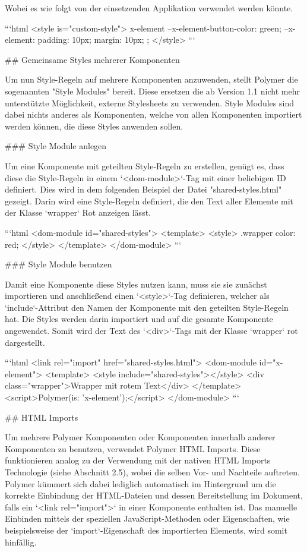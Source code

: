 Wobei es wie folgt von der einsetzenden Applikation verwendet werden könnte.

```html
<style is="custom-style">
  x-element {
    --x-element-button-color: green;
    --x-element: {
        padding: 10px;
        margin: 10px;
    };
  }
</style>
```


## Gemeinsame Styles mehrerer Komponenten

Um nun Style-Regeln auf mehrere Komponenten anzuwenden, stellt Polymer die sogenannten "Style Modules" bereit. Diese ersetzen die ab Version 1.1 nicht mehr unterstützte Möglichkeit, externe Stylesheets zu verwenden. Style Modules sind dabei nichts anderes als Komponenten, welche von allen Komponenten importiert werden können, die diese Styles anwenden sollen.


### Style Module anlegen

Um eine Komponente mit geteilten Style-Regeln zu erstellen, genügt es, dass diese die Style-Regeln in einem `<dom-module>`-Tag mit einer beliebigen ID definiert. Dies wird in dem folgenden Beispiel der Datei "shared-styles.html" gezeigt. Darin wird eine Style-Regeln definiert, die den Text aller Elemente mit der Klasse `wrapper` Rot anzeigen lässt.

```html
<dom-module id="shared-styles">
  <template>
    <style>
      .wrapper { color: red; }
    </style>
  </template>
</dom-module>
```


### Style Module benutzen

Damit eine Komponente diese Styles nutzen kann, muss sie sie zunächst importieren und anschließend einen `<style>`-Tag definieren, welcher als `include`-Attribut den Namen der Komponente mit den geteilten Style-Regeln hat. Die Styles werden darin importiert und auf die gesamte Komponente angewendet. Somit wird der Text des `<div>`-Tags mit der Klasse `wrapper` rot dargestellt.

```html
<link rel="import" href="shared-styles.html">
<dom-module id="x-element">
  <template>
    <style include="shared-styles"></style>
    <div class="wrapper">Wrapper mit rotem Text</div>
  </template>
  <script>Polymer({is: 'x-element'});</script>
</dom-module>
```


## HTML Imports

Um mehrere Polymer Komponenten oder Komponenten innerhalb anderer Komponenten zu benutzen, verwendet Polymer HTML Imports. Diese funktionieren analog zu der Verwendung mit der nativen HTML Imports Technologie (siehe Abschnitt 2.5), wobei die selben Vor- und Nachteile auftreten. Polymer kümmert sich dabei lediglich automatisch im Hintergrund um die korrekte Einbindung der HTML-Dateien und dessen Bereitstellung im Dokument, falls ein `<link rel="import">` in einer Komponente enthalten ist. Das manuelle Einbinden mittels der speziellen JavaScript-Methoden oder Eigenschaften, wie beispielsweise der `import`-Eigenschaft des importierten Elements, wird somit hinfällig.


